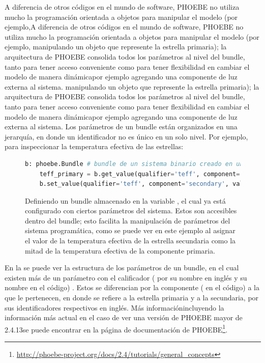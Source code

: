 A diferencia de otros códigos en el mundo de software, PHOEBE no utiliza mucho
la programación orientada a objetos para manipular el modelo (por ejemplo,A
diferencia de otros códigos en el mundo de software, PHOEBE no utiliza mucho la
programación orientada a objetos para manipular el modelo (por ejemplo,
manipulando un objeto que represente la estrella primaria); la arquitectura de
PHOEBE consolida todos los parámetros al nivel del bundle, tanto para tener
acceso conveniente como para tener flexibilidad en cambiar el modelo de manera
dinámica\textemdash por ejemplo agregando una componente de luz externa al
sistema. manipulando un objeto que represente la estrella primaria); la
arquitectura de PHOEBE consolida todos los parámetros al nivel del bundle, tanto
para tener acceso conveniente como para tener flexibilidad en cambiar el modelo
de manera dinámica\textemdash por ejemplo agregando una componente de luz
externa al sistema. Los parámetros de un bundle están organizados en una
jerarquía, en donde un identificador no es único en un solo nivel. Por ejemplo,
para inspeccionar la temperatura efectiva de las estrellas:

\begin{figure}[!ht]
	\begin{lstlisting}[language=Python, autogobble]
	b: phoebe.Bundle # bundle de un sistema binario creado en un codigo anterior
	teff_primary = b.get_value(qualifier='teff', component='primary')
	b.set_value(qualifier='teff', component='secondary', value=teff_primary/2)
	\end{lstlisting}
	\caption{Definiendo un bundle almacenado en la variable , el cual ya
	está configurado con ciertos parámetros del sistema. Estos son accesibles
	dentro del bundle; esto facilita la manipulación de parámetros del sistema
	programática, como se puede ver en este ejemplo al asignar el valor de la
	temperatura efectiva de la estrella secundaria como la mitad de la
	temperatura efectiva de la componente primaria.}
	\label{codigoAsignandoTeffPhoebe}
\end{figure}

En la  se puede ver la estructura de los parámetros de un bundle, en el cual existen más de un parámetro con el calificador ( por su nombre en inglés y su nombre en el código) . Estos se diferencian por la componente ( en el código) a la que le pertenecen, en donde  se refiere a la estrella primaria y  a la secundaria, por sus identificadores respectivos en inglés. Más información\textemdash incluyendo la información más actual en el caso de ver una versión de PHOEBE mayor de 2.4.13\textemdash se puede encontrar en la página de documentación de PHOEBE\footnote{\url{http://phoebe-project.org/docs/2.4/tutorials/general_concepts}}.

